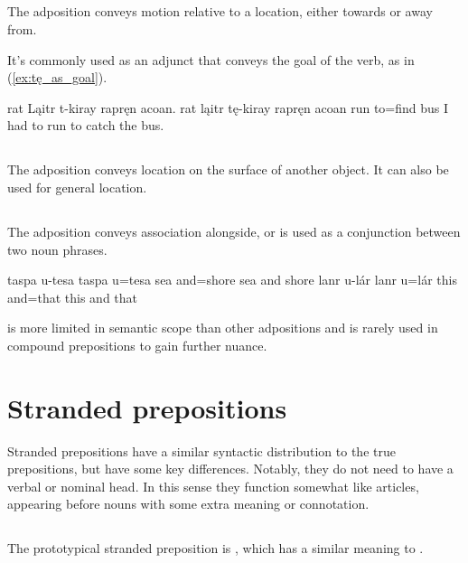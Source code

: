 \subsection{}
The adposition  conveys motion relative to a location, either towards or away from.

It's commonly used as an adjunct that conveys the goal of the verb, as in (\ref{ex:tę_as_goal}).

\begin{example}
    \label{ex:tę_as_goal}
    \script rat Ląitr t-kiray rapręn acoan.
    \bits rat ląitr tę-kiray {rapręn acoan}
     run to=find {bus}
    \tr I had to run to catch the bus.
\end{example}

\subsection{}
The adposition  conveys location on the surface of another object. It can also be used for general location.

\subsection{}
The adposition  conveys association alongside, or is used as a conjunction between two noun phrases.

\begin{subexamples}
    \ex
        \script taspa u-tesa
        \bits taspa u=tesa
        \gloss sea and=shore
        \tr sea and shore
    \ex
        \script lanr u-lár
        \bits lanr u=lár
        \gloss this and=that
        \tr this and that
\end{subexamples}

 is more limited in semantic scope than other adpositions and is rarely used in compound prepositions to gain further nuance.

\section{Stranded prepositions} \label{sec:stranded_preps}
Stranded prepositions have a similar syntactic distribution to the true prepositions, but have some key differences. Notably, they do not need to have a verbal or nominal head. In this sense they function somewhat like articles, appearing before nouns with some extra meaning or connotation.

\subsection{}
The prototypical stranded preposition is , which has a similar meaning to .

